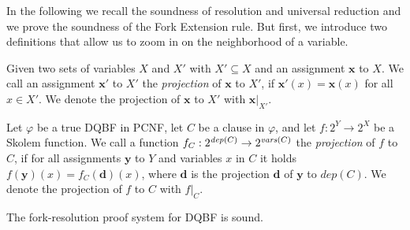 \documentclass{svjour3}
\newcommand{\dep}{\mathit{dep}}
\newcommand{\ass}[1]{\mathbf{#1}}
\begin{document}
In the following we recall the soundness of resolution and universal reduction and we prove the soundness of the Fork Extension rule. 
But first, we introduce two definitions that allow us to zoom in on the neighborhood of a variable.

\begin{definition}
	Given two sets of variables $X$ and $X'$ with $X'\subseteq X$ and an assignment $\ass x$ to $X$. 
	We call an assignment $\ass x'$ to $X'$ the \emph{projection} of $\ass x$ to $X'$, if $\ass x'(x)=\ass x(x)$ for all $x\in X'$.
	We denote the projection of $\ass x$ to $X'$ with $\ass x|_{X'}$.
\end{definition}

\begin{definition}
	Let $\varphi$ be a true DQBF in PCNF, let $C$ be a clause in $\varphi$, and let $f:2^Y\to 2^X$ be a Skolem function. 
	We call a function $f_C:2^{\dep(C)}\to 2^{\vars(C)}$ 
	the \emph{projection} of $f$ to $C$, 
	if for all assignments $\ass y$ to $Y$ and variables $x$ in $C$ it holds $f(\ass y)(x)=f_C(\ass d)(x)$, 
	where $\ass d$ is the projection $\ass d$ of $\ass y$ to $\dep(C)$. 
	We denote the projection of $f$ to $C$ with $f|_C$.
\end{definition}

\begin{lemma}
\label{lem:soundness}
	The fork-resolution proof system for DQBF is sound. 
\end{lemma}
\end{document}

